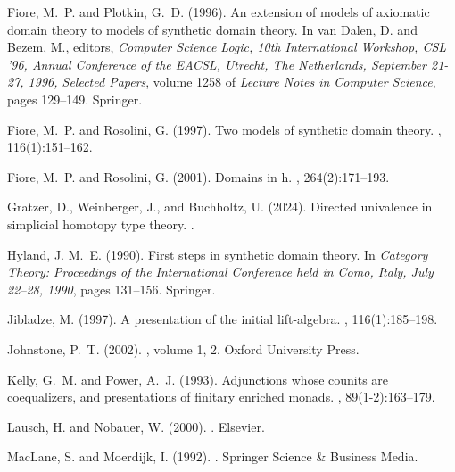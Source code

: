 \documentclass{msc}
\theoremstyle{theormstyle}
\theoremstyle{remarkstyle}
\begin{document}
\begin{thebibliography}{}
Fiore, M.~P. and Plotkin, G.~D. (1996).
\newblock An extension of models of axiomatic domain theory to models of synthetic domain theory.
\newblock In van Dalen, D. and Bezem, M., editors, {\em Computer Science Logic, 10th International Workshop, {CSL} '96, Annual Conference of the EACSL, Utrecht, The Netherlands, September 21-27, 1996, Selected Papers}, volume 1258 of {\em Lecture Notes in Computer Science}, pages 129--149. Springer.

Fiore, M.~P. and Rosolini, G. (1997).
\newblock Two models of synthetic domain theory.
, 116(1):151--162.

Fiore, M.~P. and Rosolini, G. (2001).
\newblock Domains in h.
, 264(2):171--193.

Gratzer, D., Weinberger, J., and Buchholtz, U. (2024).
\newblock Directed univalence in simplicial homotopy type theory.
.

Hyland, J. M.~E. (1990).
\newblock First steps in synthetic domain theory.
\newblock In {\em Category Theory: Proceedings of the International Conference held in Como, Italy, July 22--28, 1990}, pages 131--156. Springer.

Jibladze, M. (1997).
\newblock A presentation of the initial lift-algebra.
, 116(1):185--198.

Johnstone, P.~T. (2002).
, volume 1, 2.
\newblock Oxford University Press.

Kelly, G.~M. and Power, A.~J. (1993).
\newblock Adjunctions whose counits are coequalizers, and presentations of finitary enriched monads.
, 89(1-2):163--179.

Lausch, H. and Nobauer, W. (2000).
.
\newblock Elsevier.

MacLane, S. and Moerdijk, I. (1992).
.
\newblock Springer Science \& Business Media.


\end{thebibliography}
\end{document}
